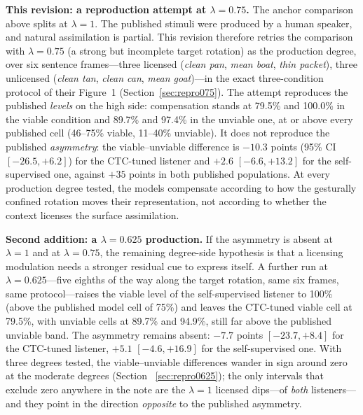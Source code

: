 \documentclass[11pt,a4paper]{article}
\newcommand{\lam}{\lambda}
\begin{document}
\medskip\noindent
\textbf{This revision: a reproduction attempt at $\lam=0.75$.} The
anchor comparison above splits at $\lam=1$. The published
stimuli were produced by a human speaker, and natural assimilation is
partial. This revision therefore retries the comparison with
$\lam=0.75$ (a strong but incomplete target rotation) as the production
degree, over six sentence frames---three licensed (\emph{clean pan},
\emph{mean boat}, \emph{thin packet}), three unlicensed (\emph{clean
tan}, \emph{clean can}, \emph{mean goat})---in the exact three-condition
protocol of their Figure~1 (Section~\ref{sec:repro075}). The attempt
reproduces the published \emph{levels} on the high side: compensation
stands at 79.5\% and 100.0\% in the viable condition and 89.7\% and
97.4\% in the unviable one, at or above every published cell
(46--75\% viable, 11--40\% unviable). It does not reproduce the
published \emph{asymmetry}: the viable--unviable difference is
$-10.3$ points (95\% CI $[-26.5, +6.2]$) for the CTC-tuned listener
and $+2.6$ $[-6.6, +13.2]$ for the self-supervised one, against $+35$
points in both published populations. At every production degree tested, the
models compensate according to how the gesturally confined rotation
moves their representation, not according to whether the context
licenses the surface assimilation.

\medskip\noindent
\textbf{Second addition: a $\lam=0.625$ production.} If the asymmetry
is absent at $\lam=1$ and at $\lam=0.75$, the remaining degree-side
hypothesis is that a licensing modulation needs a stronger residual
cue to express itself. A further run at $\lam=0.625$---five eighths
of the way along the target rotation, same six frames, same
protocol---raises the viable level of the self-supervised listener to
100\% (above the published model cell of 75\%) and leaves the
CTC-tuned viable cell at 79.5\%, with unviable cells at 89.7\% and
94.9\%, still far above the published unviable band. The asymmetry
remains absent: $-7.7$ points $[-23.7, +8.4]$ for the CTC-tuned
listener, $+5.1$ $[-4.6, +16.9]$ for the self-supervised one. With
three degrees tested, the viable--unviable differences wander in
sign around zero at the moderate degrees (Section~
\ref{sec:repro0625}); the only intervals that exclude zero anywhere
in the note are the $\lam=1$ licensed dips---of \emph{both}
listeners---and they point in the direction \emph{opposite} to the
published asymmetry.
\end{document}
